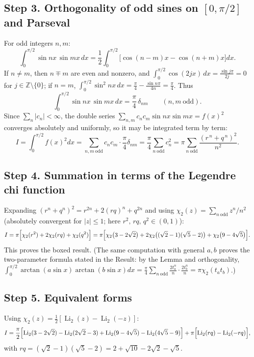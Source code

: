 \documentclass[11pt]{article}
\theoremstyle{remark}
\begin{document}
\subsection*{Step 3. Orthogonality of odd sines on $[0,\pi/2]$ and Parseval}

For odd integers $n,m$:
\[
\int_0^{\pi/2}\sin nx\,\sin mx\,dx=\frac12\int_0^{\pi/2}\bigl[\cos(n-m)x-\cos(n+m)x\bigr]dx .
\]
If $n\ne m$, then $n\mp m$ are even and nonzero, and $\int_0^{\pi/2}\cos(2jx)\,dx=\frac{\sin j\pi}{2j}=0$ for $j\in\mathbb Z\setminus\{0\}$; if $n=m$, $\int_0^{\pi/2}\sin^2 nx\,dx=\frac\pi4-\frac{\sin n\pi}{4n}=\frac\pi4$. Thus
\[
\int_0^{\pi/2}\sin nx\,\sin mx\,dx=\frac{\pi}{4}\,\delta_{nm}\qquad(n,m\ \text{odd}).
\]
Since $\sum_n|c_n|<\infty$, the double series $\sum_{n,m}c_nc_m\sin nx\sin mx=f(x)^2$ converges absolutely and uniformly, so it may be integrated term by term:
\[
I=\int_0^{\pi/2}f(x)^2dx=\sum_{n,m\ \mathrm{odd}}c_nc_m\cdot\frac\pi4\delta_{nm}
=\frac{\pi}{4}\sum_{n\ \mathrm{odd}}c_n^{2}
=\pi\sum_{n\ \mathrm{odd}}\frac{(r^{\,n}+q^{\,n})^{2}}{n^{2}} .
\]

\subsection*{Step 4. Summation in terms of the Legendre chi function}

Expanding $(r^n+q^n)^2=r^{2n}+2(rq)^n+q^{2n}$ and using $\chi_2(z)=\sum_{n\ \mathrm{odd}}z^n/n^2$ (absolutely convergent for $|z|\le1$; here $r^2,\,rq,\,q^2\in(0,1)$):
\[
I=\pi\Bigl[\chi_2(r^{2})+2\chi_2(rq)+\chi_2(q^{2})\Bigr]
 =\pi\Bigl[\chi_2\bigl(3-2\sqrt2\bigr)+2\chi_2\bigl((\sqrt2-1)(\sqrt5-2)\bigr)+\chi_2\bigl(9-4\sqrt5\bigr)\Bigr].
\]
This proves the boxed result. (The same computation with general $a,b$ proves the two-parameter formula stated in the Result: by the Lemma and orthogonality, $\int_0^{\pi/2}\arctan(a\sin x)\arctan(b\sin x)dx=\frac\pi4\sum_{n\ \mathrm{odd}}\frac{2t_a^n}{n}\cdot\frac{2t_b^n}{n}=\pi\chi_2(t_at_b)$.)

\subsection*{Step 5. Equivalent forms}

Using $\chi_2(z)=\tfrac12[\operatorname{Li}_2(z)-\operatorname{Li}_2(-z)]$:
\[
I=\frac{\pi}{2}\Bigl[\operatorname{Li}_2(3-2\sqrt2)-\operatorname{Li}_2(2\sqrt2-3)+\operatorname{Li}_2(9-4\sqrt5)-\operatorname{Li}_2(4\sqrt5-9)\Bigr]
+\pi\Bigl[\operatorname{Li}_2(rq)-\operatorname{Li}_2(-rq)\Bigr],
\]
with $rq=(\sqrt2-1)(\sqrt5-2)=2+\sqrt{10}-2\sqrt2-\sqrt5$.
\end{document}
